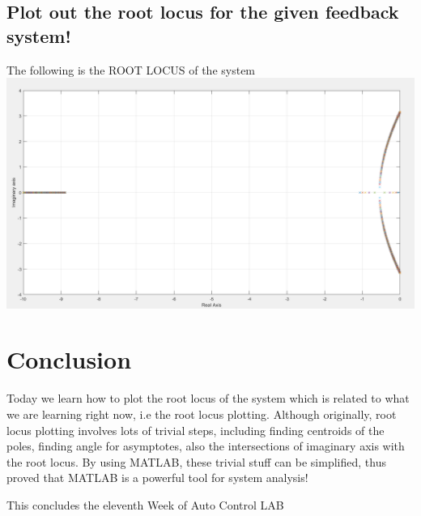 \documentclass[12pt]{article}
\begin{document}
\cleardoublepage


\subsection{Plot out the root locus for the given feedback system!}
The following is the ROOT LOCUS of the system\\

\includegraphics[scale=0.4]{Result2.png}\\


\section{Conclusion}
Today we learn how to plot the root locus of the system which is related to what we are learning right now, i.e the root locus plotting. Although originally, root locus plotting involves lots of trivial steps, including finding centroids of the poles, finding angle for asymptotes, also the intersections of imaginary axis with the root locus. By using MATLAB, these trivial stuff can be simplified, thus proved that MATLAB is a powerful tool for system analysis!

\begin{center}
This concludes the eleventh Week of Auto Control LAB\\
\end{center}
\end{document}
